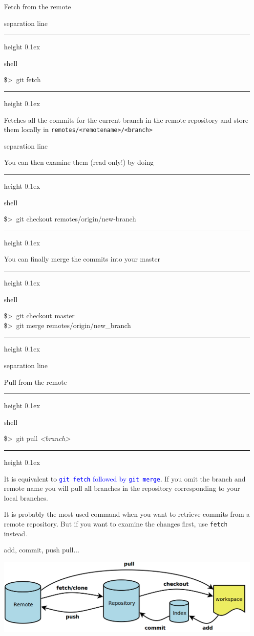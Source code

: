 \documentclass[hyperref={colorlinks}]{beamer}
\newenvironment{shell}{%
\footnotesize\flushleft\hrule height 0.1ex
\tt\begin{beamercolorbox}[sep=1ex,left]{shell}%
}{%
\end{beamercolorbox}
\hrule height 0.1ex
\endflushleft\par
}
\newcommand*{\psone}[1][ant]{\$>~}
\newcommand*{\var}[1]{{\it<#1>}}
\newcommand{\titleline}[1][0.025cm]{%
\begin{beamercolorbox}[wd=\paperwidth,ht=#1,center]{separation line}%
\end{beamercolorbox}%
}
\begin{document}
\begin{frame}{Fetch from the remote}
\titleline
\begin{shell}
\psone git fetch \var{remote-name}
\end{shell}
Fetches all the commits for the current branch in the remote repository
and store them \alert{locally} in \texttt{remotes/<remotename>/<branch>}
\titleline

You can then examine them (read only!) by doing
\begin{shell}
\psone git checkout remotes/origin/new-branch
\end{shell}

You can finally merge the commits into your master
\begin{shell}
\psone git checkout master\\
\psone git merge remotes/origin/new_branch
\end{shell}
\titleline
\end{frame}
\begin{frame}{Pull from the remote}
\begin{shell}
\psone git pull \var{remote-name} \var{branch}
\end{shell}

It is equivalent to \textcolor{blue}{\texttt{git fetch} followed by
\texttt{git merge}}. If you omit the branch and remote name you will pull all branches in the repository corresponding to your local branches.
\medskip

\alert{It is probably the most used command when you want to retrieve commits from a remote repository.} But if you want to examine the changes first, use \texttt{fetch} instead.
\end{frame}

\begin{frame}{add, commit, push pull...}
\centerline{\includegraphics[width=\textwidth]{figures/pullandfetch}}
\end{frame}
\end{document}
